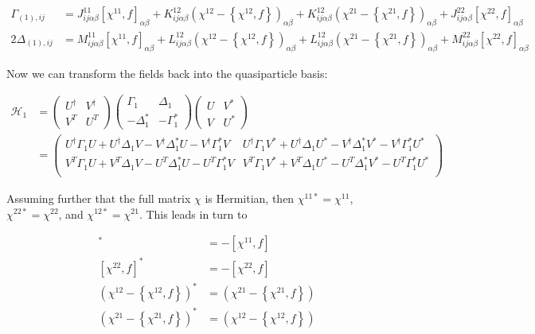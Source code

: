 \begin{align}
\Gamma_{(1),ij} &= J^{11}_{ij\alpha\beta}[\chi^{11},f]_{\alpha\beta} + K^{12}_{ij\alpha\beta}\left(\chi^{12}-\left\{\chi^{12},f\right\}\right)_{\alpha\beta} + K^{12}_{ij\alpha\beta}\left(\chi^{21}-\left\{\chi^{21},f\right\}\right)_{\alpha\beta} + J^{22}_{ij\alpha\beta}[\chi^{22},f]_{\alpha\beta} \\
2\Delta_{(1),ij}  &= M^{11}_{ij\alpha\beta}[\chi^{11},f]_{\alpha\beta} + L^{12}_{ij\alpha\beta}\left(\chi^{12}-\left\{\chi^{12},f\right\}\right)_{\alpha\beta} + L^{12}_{ij\alpha\beta}\left(\chi^{21}-\left\{\chi^{21},f\right\}\right)_{\alpha\beta} + M^{22}_{ij\alpha\beta}[\chi^{22},f]_{\alpha\beta}
\end{align}

Now we can transform the fields back into the quasiparticle basis:

\begin{align}
\mathcal{H}_1 &= 
\left(\begin{array}{cc}
U^\dagger & V^\dagger \\
V^T & U^T
\end{array}\right)
\left(\begin{array}{cc}
\Gamma_1 & \Delta_1 \\
-\Delta_1^* & -\Gamma_1^*
\end{array}\right)
\left(\begin{array}{cc}
U & V^* \\
V & U^*
\end{array}\right) \\
&= \left(\begin{array}{cc}
U^\dagger\Gamma_1U + U^\dagger\Delta_1V - V^\dagger\Delta_1^*U - V^\dagger\Gamma_1^*V & 
U^\dagger\Gamma_1V^* + U^\dagger\Delta_1U^* - V^\dagger\Delta_1^*V^* - V^\dagger\Gamma_1^*U^* \\
V^T\Gamma_1U + V^T\Delta_1V - U^T\Delta_1^*U - U^T\Gamma_1^*V & 
V^T\Gamma_1V^* + V^T\Delta_1U^* - U^T\Delta_1^*V^* - U^T\Gamma_1^*U^* \\
\end{array}\right)
\end{align}

\noindent Assuming further that the full matrix $\chi$ is Hermitian, then $\chi^{11*}=\chi^{11}$, $\chi^{22*}=\chi^{22}$, and $\chi^{12*}=\chi^{21}$. This leads in turn to

\begin{align}
[\chi^{11},f]^* &= -[\chi^{11},f] \\
[\chi^{22},f]^* &= -[\chi^{22},f] \\
\left(\chi^{12}-\left\{\chi^{12},f\right\}\right)^* &= \left(\chi^{21}-\left\{\chi^{21},f\right\}\right) \\
\left(\chi^{21}-\left\{\chi^{21},f\right\}\right)^* &= \left(\chi^{12}-\left\{\chi^{12},f\right\}\right)
\end{align}

